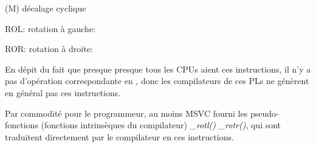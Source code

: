 \label{ROL_ROR}
\item[ROL/ROR] (M) décalage cyclique

ROL: rotation à gauche:



ROR: rotation à droite:



En dépit du fait que presque presque tous les \ac{CPU}s aient ces instructions, il n'y
a pas d'opération correspondante en \CCpp, donc les compilateurs de ces \ac{PL}s
ne génèrent en général pas ces instructions.

Par commodité pour le programmeur, au moins \ac{MSVC} fourni les pseudo-fonctions
(fonctions intrinsèques du compilateur)
\emph{\_rotl()} \AndENRU \emph{\_rotr()}\FNMSDNROTxURL{},
qui sont traduitent directement par le compilateur en ces instructions.

